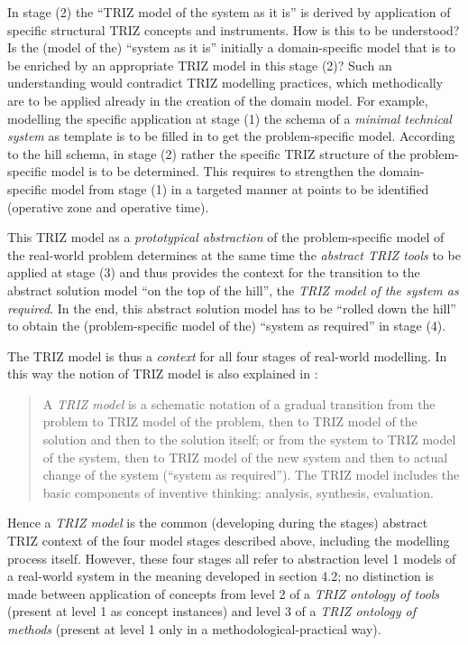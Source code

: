 \documentclass[12pt,a4paper]{article}
\begin{document}
In stage (2) the “TRIZ model of the system as it is” is derived by application
of specific structural TRIZ concepts and instruments. How is this to be
understood? Is the (model of the) “system as it is” initially a
domain-specific model that is to be enriched by an appropriate TRIZ model in
this stage (2)? Such an understanding would contradict TRIZ modelling
practices, which methodically are to be applied already in the creation of the
domain model. For example, modelling the specific application at stage (1) the
schema of a \emph{minimal technical system} as template is to be filled in to
get the problem-specific model. According to the hill schema, in stage (2)
rather the specific TRIZ structure of the problem-specific model is to be
determined. This requires to strengthen the domain-specific model from stage
(1) in a targeted manner at points to be identified (operative zone and
operative time).

This TRIZ model as a \emph{prototypical abstraction} of the problem-specific
model of the real-world problem determines at the same time the \emph{abstract
  TRIZ tools} to be applied at stage (3) and thus provides the context for the
transition to the abstract solution model “on the top of the hill”, the
\emph{TRIZ model of the system as required}. In the end, this abstract
solution model has to be “rolled down the hill” to obtain the
(problem-specific model of the) “system as required” in stage (4).

The TRIZ model is thus a \emph{context} for all four stages of real-world
modelling. In this way the notion of TRIZ model is also explained in
\cite{23}:
\begin{quote}  
  A \emph{TRIZ model} is a schematic notation of a gradual transition from the
  problem to TRIZ model of the problem, then to TRIZ model of the solution and
  then to the solution itself; or from the system to TRIZ model of the system,
  then to TRIZ model of the new system and then to actual change of the system
  (“system as required”). The TRIZ model includes the basic components of
  inventive thinking: analysis, synthesis, evaluation.
\end{quote}
Hence a \emph{TRIZ model} is the common (developing during the stages)
abstract TRIZ context of the four model stages described above, including the
modelling process itself. However, these four stages all refer to abstraction
level 1 models of a real-world system in the meaning developed in section 4.2;
no distinction is made between application of concepts from level 2 of a
\emph{TRIZ ontology of tools} (present at level 1 as concept instances) and
level 3 of a \emph{TRIZ ontology of methods} (present at level 1 only in a
methodological-practical way).
\end{document}
